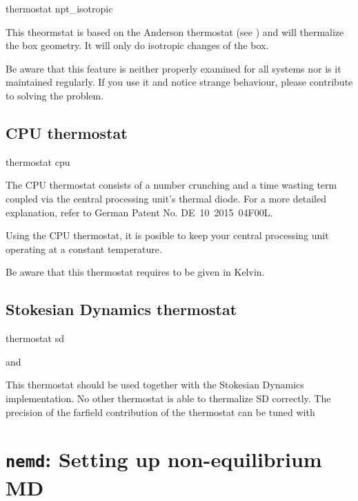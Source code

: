 \begin{essyntax}
  thermostat npt_isotropic   
  \begin{features}
  \end{features}
\end{essyntax}

This theormstat is based on the Anderson thermostat (see
\cite{andersen80a, mann05d}) and will thermalize the box geometry. It
will only do isotropic changes of the box.

Be aware that this feature is neither properly examined for all
systems nor is it maintained regularly. If you use it and notice
strange behaviour, please contribute to solving the problem.
\subsection{CPU thermostat}

\begin{essyntax}
  thermostat cpu 
\end{essyntax}

The CPU thermostat consists of a number crunching and a time wasting
term coupled via the central processing unit's thermal diode. For a
more detailed explanation, refer to German Patent No. DE~10~2015~04F00L.

Using the CPU thermostat, it is posible to keep your central
processing unit operating at a constant temperature.

Be aware that this thermostat requires  to be given
in Kelvin.

\subsection{Stokesian Dynamics thermostat}
\label{ssec:SDthermostat}
\begin{essyntax}
  thermostat sd 
  \begin{features}
     and 
  \end{features}
\end{essyntax}

This thermostat should be used together with the Stokesian Dynamics
implementation.
No other thermostat is able to thermalize SD correctly.
The precision of the farfield contribution of the thermostat can be tuned
with

\section{\texttt{nemd}: Setting up non-equilibrium MD}
\label{sec:NEMD}

